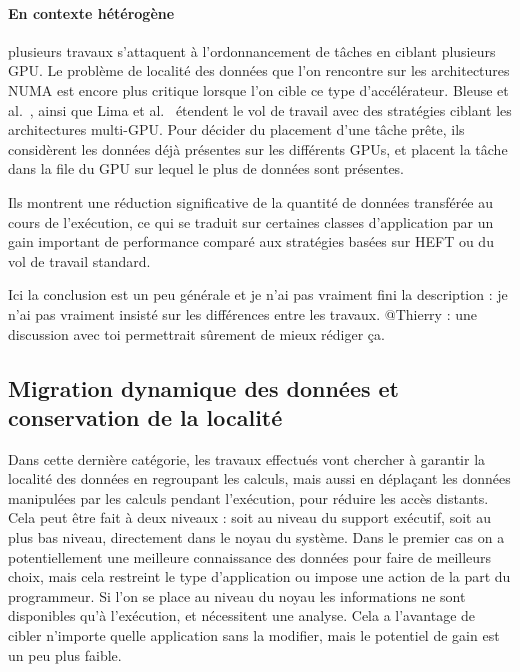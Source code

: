 \paragraph{En contexte hétérogène} plusieurs travaux s'attaquent à l'ordonnancement de tâches en ciblant plusieurs GPU.
Le problème de localité des données que l'on rencontre sur les architectures NUMA est encore plus critique lorsque l'on cible ce type d'accélérateur.
Bleuse et al.~\cite{Bleuse2014}, ainsi que Lima et al.~\cite{Lima2015} étendent le vol de travail avec des stratégies ciblant les architectures multi-GPU.
Pour décider du placement d'une tâche prête, ils considèrent les données déjà présentes sur les différents GPUs, et placent la tâche dans la file du GPU sur lequel le plus de données sont présentes.

Ils montrent une réduction significative de la quantité de données transférée au cours de l'exécution, ce qui se traduit sur certaines classes d'application par un gain important de performance comparé aux stratégies basées sur HEFT ou du vol de travail standard.

\begin{todo}
  Ici la conclusion est un peu générale et je n'ai pas vraiment fini la description : je n'ai pas vraiment insisté sur les différences entre les travaux.
  @Thierry : une discussion avec toi permettrait sûrement de mieux rédiger ça.
\end{todo}


\subsection{Migration dynamique des données et conservation de la localité}\label{sec:rw:numa:thread-data}

Dans cette dernière catégorie, les travaux effectués vont chercher à garantir la localité des données en regroupant les calculs, mais aussi en déplaçant les données manipulées par les calculs pendant l'exécution, pour réduire les accès distants.
Cela peut être fait à deux niveaux : soit au niveau du support exécutif, soit au plus bas niveau, directement dans le noyau du système.
Dans le premier cas on a potentiellement une meilleure connaissance des données pour faire de meilleurs choix, mais cela restreint le type d'application ou impose une action de la part du programmeur.
Si l'on se place au niveau du noyau les informations ne sont disponibles qu'à l'exécution, et nécessitent une analyse. Cela a l'avantage de cibler n'importe quelle application sans la modifier, mais le potentiel de gain est un peu plus faible.

